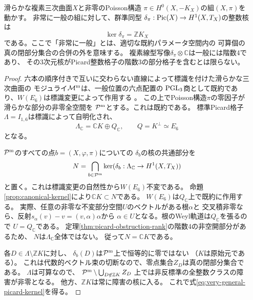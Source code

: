 \begin{theorem}[非常に一般の一次Picard障害の整数核]\label{thm:very-general-picard-kernel}
滑らかな複素三次曲面$X$と非零のPoisson構造
$\pi\in H^0(X,-K_X)$の組$(X,\pi)$を動かす。
非常に一般の組に対して、群準同型
$\delta_\pi:\operatorname{Pic}(X)\to H^1(X,T_X)$の整数核は
\begin{equation}\label{eq:very-general-picard-kernel}
 \boxed{\ker\delta_\pi=\mathbb Z K_X}
\end{equation}
である。ここで「非常に一般」とは、適切な既約パラメータ空間内の
可算個の真の閉部分集合の合併の外を意味する。
複素線型写像$\delta_\pi\otimes\mathbb C$は一般には階数4であり、
その3次元核がPicard整数格子の階数3の部分格子を含むとは限らない。
\end{theorem}
\begin{proof}
六本の順序付きで互いに交わらない直線によって標識を付けた滑らかな三次曲面の
モジュライ$\mathcal M^{\rm m}$は、一般位置の六点配置の
$\operatorname{PGL}_3$商として既約であり、$W(E_6)$は標識変更によって作用する
\cite[\S\S2.5--2.6]{DGK}。
この上でPoisson構造$\pi$の零因子が滑らかな部分の非零全空間を
$\mathcal P^{\rm m}$とする。これは既約である。
標準Picard格子$\Lambda=I_{1,6}$は標識によって自明化され、
\[
 \Lambda_\mathbb C=\mathbb C K\oplus Q_\mathbb C,
 \qquad Q=K^\perp\simeq E_6
\]
となる。

$\mathcal P^{\rm m}$のすべての点$b=(X,\varphi,\pi)$についての
$\delta_b$の核の共通部分を
\[
 N=\bigcap_{b\in\mathcal P^{\rm m}}
       \ker(\delta_b:\Lambda_\mathbb C\to H^1(X,T_X))
\]
と置く。これは標識変更の自然性から$W(E_6)$不変である。
命題\ref{prop:canonical-kernel}により$\mathbb CK\subset N$である。
$W(E_6)$は$Q_\mathbb C$上で既約に作用する。
実際、任意の非零な不変部分空間$U$のベクトルがある根$\alpha$と
交叉積非零なら、反射$s_\alpha(v)-v=(v,\alpha)\alpha$から
$\alpha\in U$となる。根のWeyl軌道は$Q_\mathbb C$を張るので
$U=Q_\mathbb C$である。
定理\ref{thm:picard-obstruction-rank}の階数4の非空開部分があるため、
$N$は$\Lambda_\mathbb C$全体ではない。
従って$N=\mathbb CK$である。

各$D\in\Lambda\setminus\mathbb ZK$に対し、
$\delta_b(D)$は$\mathcal P^{\rm m}$上で恒等的に零ではない
（$K$は原始元である）。
これは代数的ベクトル束の切断なので、零点集合$Z_D$は真の閉部分集合である。
$\Lambda$は可算なので、
$\mathcal P^{\rm m}\setminus\bigcup_{D\notin\mathbb ZK}Z_D$
上では非反標準の全整数クラスの障害が非零となる。
他方、$\mathbb ZK$は常に障害の核に入る。
これで式\eqref{eq:very-general-picard-kernel}を得る。
\end{proof}

